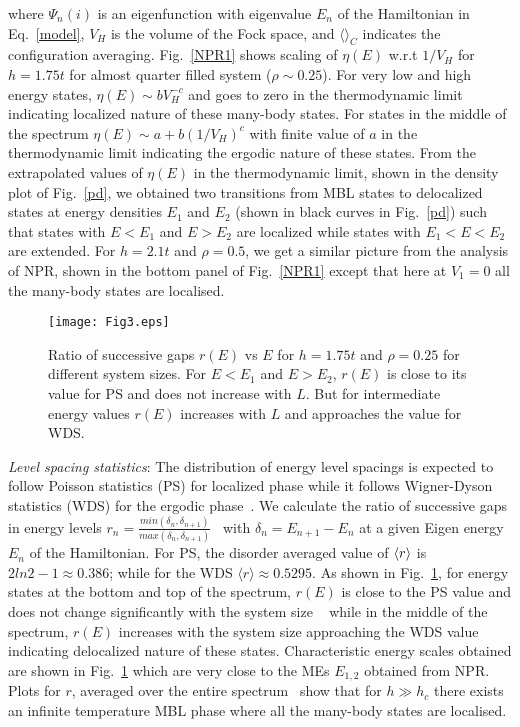 \documentclass[prl,aps,twocolumn,floats,nofootinbib,showpacs]{revtex4}
\begin{document}
where $\Psi_n(i)$ is an eigenfunction with eigenvalue $E_n$ of the Hamiltonian in Eq.~\ref{model}, $V_H$ is the volume of the Fock space, and $\langle \rangle _C$ indicates the configuration averaging. Fig.~\ref{NPR1} shows scaling of $\eta(E)$ w.r.t $1/V_H$ for $h=1.75t$ for almost quarter filled system ($\rho \sim 0.25$). For very low and high energy states, $\eta(E) \sim bV_H^{-c}$ and goes to zero in the thermodynamic limit indicating localized nature of these many-body states. For states in the middle of the spectrum $\eta(E) \sim a+b(1/V_H)^c$ with finite value of $a$ in the thermodynamic limit indicating the ergodic nature of these states. From the extrapolated values of $\eta(E)$ in the thermodynamic limit, shown in the density plot of Fig.~\ref{pd}, we obtained two transitions from MBL states to delocalized states at energy densities $E_1$ and $E_2$ (shown in black curves in Fig.~\ref{pd}) such that states with $E < E_1$ and $E> E_2$ are localized while states with $E_1<E<E_2$ are extended. For $h=2.1t$ and $\rho=0.5$, we get a similar picture from the analysis of NPR, shown in the bottom panel of Fig.~\ref{NPR1} except that here at $V_1=0$ all the many-body states are localised.
\begin{figure}[h!]
\begin{center}
\hskip-0.35cm
\texttt{[image: Fig3.eps]}
\vskip-0.6cm
\caption{Ratio of successive gaps $r(E)$ vs $E$ for $h=1.75t$ and $\rho=0.25$ for different system sizes. For $E < E_1$ and $E >E_2$, $r(E)$ is close to its value for PS and does not increase with $L$. But for intermediate energy values $r(E)$ increases with $L$ and approaches the value for WDS.}
\label{r}
\end{center}
\end{figure}

{\it{ Level spacing statistics}}:
The distribution of energy level spacings is expected to follow Poisson statistics (PS) for localized phase while it follows Wigner-Dyson statistics (WDS) for the ergodic phase~\cite{Mehta}. 
We calculate the ratio of successive gaps in energy levels $r_n=\frac{min(\delta_n,\delta_{n+1})}{max(\delta_n,\delta_{n+1})}$~\cite{Huse2007} with $\delta_n=E_{n+1}-E_{n}$ at a given Eigen energy $E_n$ of the Hamiltonian. For PS, the disorder averaged value of $\langle r \rangle$ is $2ln2-1\approx 0.386$; while for the WDS $\langle r\rangle \approx 0.5295$. 
As shown in Fig.~\ref{r}, for energy states at the bottom and top of the spectrum, $r(E)$ is close to the PS value and does not change significantly with the system size ~\cite{footnote} while in the middle of the spectrum, $r(E)$ increases with the system size approaching the WDS value indicating delocalized nature of these states. Characteristic energy scales obtained are shown in Fig.~\ref{r} which are very close to the MEs $E_{1,2}$ obtained from NPR. 
Plots for $r$, averaged over the entire spectrum~\cite{supplemental} show that for $h \gg h_c$ there exists an  infinite temperature MBL phase where all the many-body states are localised.
\end{document}
